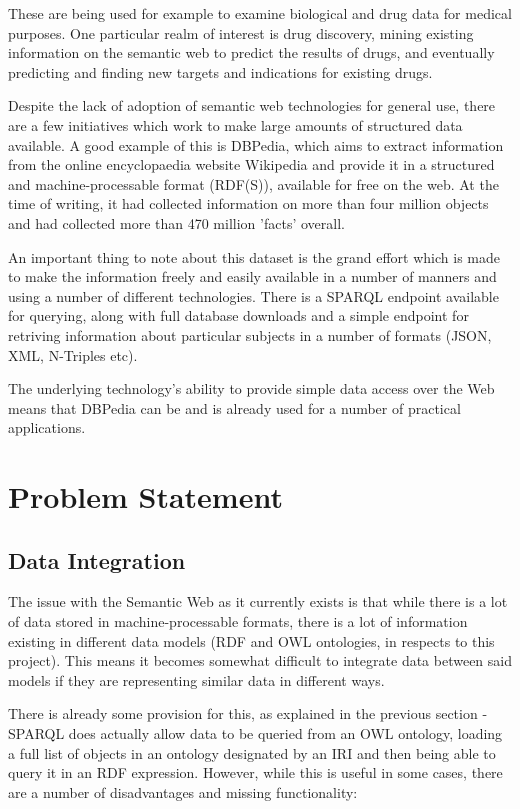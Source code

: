 \documentclass{article}
\begin{document}
These are being used for example to examine biological and drug data for medical
purposes\cite{humontology}. One particular realm of interest is drug discovery,
mining existing information on the semantic web to predict the results of drugs,
and eventually predicting and finding new targets and indications for existing
drugs\cite{semwebdiscoverty}.

Despite the lack of adoption of semantic web technologies for general use, there
are a few initiatives which work to make large amounts of structured data
available. A good example of this is DBPedia, which aims to extract
information from the online encyclopaedia website Wikipedia and provide it in a
structured and machine-processable format (RDF(S)), available for free on the 
web. At the time of writing, it had collected information on more than four 
million objects and had collected more than 470 million 'facts' overall.

An important thing to note about this dataset is the grand effort which is made
to make the information freely and easily available in a number of manners and
using a number of different technologies. There is a SPARQL endpoint available
for querying, along with full database downloads and a simple endpoint for
retriving information about particular subjects in a number of formats (JSON,
XML, N-Triples etc).

The underlying technology's ability to provide simple data access over the Web
means that DBPedia can be and is already used for a number of practical
applications.\cite{dbpedia-uses}

\section{Problem Statement}

\subsection{Data Integration}

The issue with the Semantic Web as it currently exists is that while there is a
lot of data stored in machine-processable formats, there is a lot of information 
existing in different data models (RDF and OWL ontologies, in respects to this project). 
This means it becomes somewhat difficult to integrate data between said models 
if they are representing similar data in different ways.

There is already some provision for this, as explained in the previous section - 
SPARQL does actually allow data to be queried from an OWL ontology, loading a full 
list of objects in an ontology designated by an IRI and then being able to query 
it in an RDF expression. However, while this is useful in some cases, there are
a number of disadvantages and missing functionality:
\end{document}
